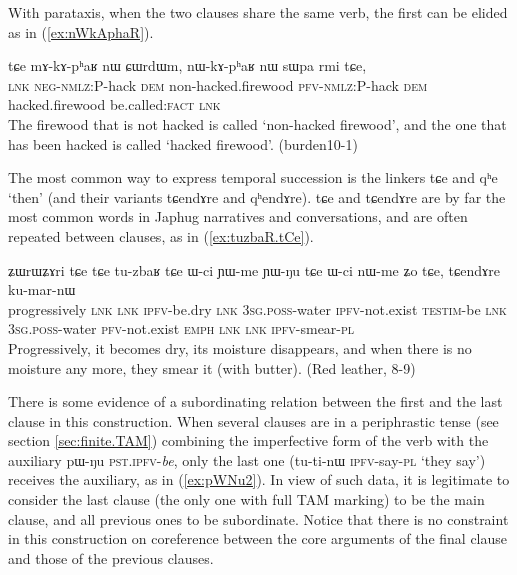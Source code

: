 \documentclass[oldfontcommands,oneside,a4paper,11pt]{article}
\newcommand{\ipa}[1]{{\phon \mbox{#1}}} %
\newcommand{\refb}[1]{(\ref{#1})}
\begin{document}
With parataxis, when the two clauses share the same verb, the first can be elided as in \refb{ex:nWkAphaR}.

\begin{exe}
\ex \label{ex:nWkAphaR}
\gll 
\ipa{tɕe}  	\ipa{mɤ-kɤ-pʰaʁ}  	\ipa{nɯ}  	\ipa{ɕɯrdɯm,}  	\ipa{nɯ-kɤ-pʰaʁ}  	\ipa{nɯ}  	\ipa{sɯpa}  	\ipa{rmi}  	\ipa{tɕe,}  	\\
\textsc{lnk} \textsc{neg-nmlz:}P-hack \textsc{dem} non-hacked.firewood \textsc{pfv-nmlz:}P-hack \textsc{dem} hacked.firewood be.called:\textsc{fact} \textsc{lnk} \\
\glt The firewood that is not hacked is called `non-hacked firewood', and the one that has been hacked is called `hacked firewood'. (burden10-1)
\end{exe}

The most common way to express temporal succession is the linkers \ipa{tɕe} and \ipa{qʰe} `then' (and their variants \ipa{tɕendɤre} and \ipa{qʰendɤre}). \ipa{tɕe}   and \ipa{tɕendɤre} are by far the most common words in Japhug narratives and conversations, and are often repeated between clauses, as in \refb{ex:tuzbaR.tCe}. 

\begin{exe}
\ex \label{ex:tuzbaR.tCe}
\gll 
\ipa{ʑɯrɯʑɤri}  	\ipa{tɕe}  	\ipa{tɕe}  	\ipa{tu-zbaʁ}  	\ipa{tɕe}  	\ipa{ɯ-ci}  	\ipa{ɲɯ-me}  	\ipa{ɲɯ-ŋu}  	\ipa{tɕe}  	\ipa{ɯ-ci}  	\ipa{nɯ-me}  	\ipa{ʑo}  	\ipa{tɕe,}  	\ipa{tɕendɤre}  	\ipa{ku-mar-nɯ}  \\
progressively \textsc{lnk}  \textsc{lnk} \textsc{ipfv}-be.dry   \textsc{lnk}  \textsc{3sg.poss}-water \textsc{ipfv}-not.exist \textsc{testim}-be \textsc{lnk} \textsc{3sg.poss}-water \textsc{pfv}-not.exist \textsc{emph} \textsc{lnk}  \textsc{lnk} \textsc{ipfv}-smear-\textsc{pl} \\
\glt Progressively, it becomes dry, its moisture  disappears, and when there is no moisture any more, they smear it (with butter). (Red leather, 8-9)
\end{exe}

There is some evidence of a subordinating relation between the first and the last clause in this construction. When several clauses are in a periphrastic tense (see section \ref{sec:finite.TAM}) combining the imperfective form of the verb with the auxiliary \ipa{pɯ-ŋu} \textsc{pst.ipfv}-\textit{be}, only the last one (\ipa{tu-ti-nɯ}  \textsc{ipfv}-say-\textsc{pl} `they  say') receives the auxiliary, as in \refb{ex:pWNu2}. In view of such data, it is legitimate to consider the last clause (the only one with full TAM marking) to  be the main clause, and all previous ones to be subordinate. Notice that there is no constraint in this construction on coreference between the core arguments of the final clause and those of the previous clauses.
\end{document}
